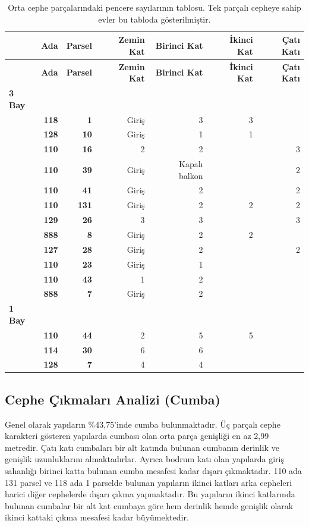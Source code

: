 \documentclass[12pt,turkish,a4paperpaper,]{report}
\begin{document}
\begin{longtable}[]{@{}lrrrrrr@{}}
\caption{Orta cephe parçalarındaki pencere sayılarının tablosu. Tek
parçalı cepheye sahip evler bu tabloda gösterilmiştir.}\tabularnewline
\toprule
& \textbf{Ada} & \textbf{Parsel} & \textbf{Zemin Kat} & \textbf{Birinci
Kat} & \textbf{İkinci Kat} & \textbf{Çatı Katı}\tabularnewline
\midrule
\endfirsthead
\toprule
& \textbf{Ada} & \textbf{Parsel} & \textbf{Zemin Kat} & \textbf{Birinci
Kat} & \textbf{İkinci Kat} & \textbf{Çatı Katı}\tabularnewline
\midrule
\endhead
\textbf{3 Bay} & & & & & &\tabularnewline
& \textbf{118} & \textbf{1} & Giriş & 3 & 3 &\tabularnewline
& \textbf{128} & \textbf{10} & Giriş & 1 & 1 &\tabularnewline
& \textbf{110} & \textbf{16} & 2 & 2 & & 3\tabularnewline
& \textbf{110} & \textbf{39} & Giriş & Kapalı balkon & &
2\tabularnewline
& \textbf{110} & \textbf{41} & Giriş & 2 & & 2\tabularnewline
& \textbf{110} & \textbf{131} & Giriş & 2 & 2 & 2\tabularnewline
& \textbf{129} & \textbf{26} & 3 & 3 & & 3\tabularnewline
& \textbf{888} & \textbf{8} & Giriş & 2 & 2 &\tabularnewline
& \textbf{127} & \textbf{28} & Giriş & 2 & & 2\tabularnewline
& \textbf{110} & \textbf{23} & Giriş & 1 & &\tabularnewline
& \textbf{110} & \textbf{43} & 1 & 2 & &\tabularnewline
& \textbf{888} & \textbf{7} & Giriş & 2 & &\tabularnewline
\textbf{1 Bay} & & & & & &\tabularnewline
& \textbf{110} & \textbf{44} & 2 & 5 & 5 &\tabularnewline
& \textbf{114} & \textbf{30} & 6 & 6 & &\tabularnewline
& \textbf{128} & \textbf{7} & 4 & 4 & &\tabularnewline
\bottomrule
\end{longtable}

\newpage

\hypertarget{cephe-uxe7ux131kmalarux131-analizi-cumba}{%
\subsection{Cephe Çıkmaları Analizi
(Cumba)}\label{cephe-uxe7ux131kmalarux131-analizi-cumba}}

Genel olarak yapıların \%43,75'inde cumba bulunmaktadır. Üç parçalı
cephe karakteri gösteren yapılarda cumbası olan orta parça genişliği en
az 2,99 metredir. Çatı katı cumbaları bir alt katında bulunan cumbanın
derinlik ve genişlik uzunluklarını almaktadırlar. Ayrıca bodrum katı
olan yapılarda giriş sahanlığı birinci katta bulunan cumba mesafesi
kadar dışarı çıkmaktadır. 110 ada 131 parsel ve 118 ada 1 parselde
bulunan yapıların ikinci katları arka cepheleri harici diğer cephelerde
dışarı çıkma yapmaktadır. Bu yapıların ikinci katlarında bulunan
cumbalar bir alt kat cumbaya göre hem derinlik hemde genişlik olarak
ikinci kattaki çıkma mesafesi kadar büyümektedir.
\end{document}
